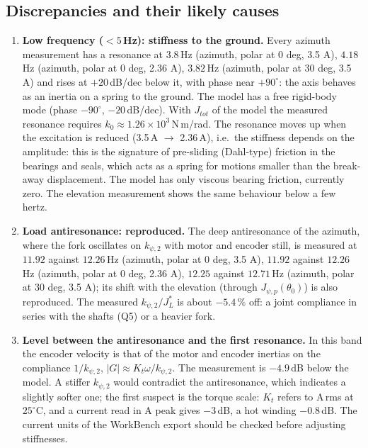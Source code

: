 \documentclass[10pt,a4paper]{article}
\numberwithin{equation}{section}
\begin{document}
\subsection{Discrepancies and their likely causes}\label{subsec:exp_discussion}
\begin{enumerate}
\item \textbf{Low frequency ($<5$\,Hz): stiffness to the ground.} Every azimuth measurement has a resonance at $3.8$\,Hz (azimuth, polar at 0 deg, 3.5 A), $4.18$\,Hz (azimuth, polar at 0 deg, 2.36 A), $3.82$\,Hz (azimuth, polar at 30 deg, 3.5 A) and rises at $+20$\,dB/dec below it, with phase near $+90^\circ$: the axis behaves as an inertia on a spring to the ground. The model has a free rigid-body mode (phase $-90^\circ$, $-20$\,dB/dec). With $J_{tot}$ of the model the measured resonance requires $k_0 \approx 1.26\times10^{3}$\,N\,m/rad. The resonance moves up when the excitation is reduced (3.5\,A $\to$ 2.36\,A), i.e.\ the stiffness depends on the amplitude: this is the signature of pre-sliding (Dahl-type) friction in the bearings and seals, which acts as a spring for motions smaller than the break-away displacement. The model has only viscous bearing friction, currently zero. The elevation measurement shows the same behaviour below a few hertz.
\item \textbf{Load antiresonance: reproduced.} The deep antiresonance of the azimuth, where the fork oscillates on $k_{\psi,2}$ with motor and encoder still, is measured at $11.92$ against $12.26$\,Hz (azimuth, polar at 0 deg, 3.5 A), $11.92$ against $12.26$\,Hz (azimuth, polar at 0 deg, 2.36 A), $12.25$ against $12.71$\,Hz (azimuth, polar at 30 deg, 3.5 A); its shift with the elevation (through $J_{\psi,p}(\theta_0)$) is also reproduced. The measured $k_{\psi,2}/J_L^*$ is about $-5.4\,\%$ off: a joint compliance in series with the shafts (Q5) or a heavier fork.
\item \textbf{Level between the antiresonance and the first resonance.} In this band the encoder velocity is that of the motor and encoder inertias on the compliance $1/k_{\psi,2}$, $|G|\approx K_t\omega/k_{\psi,2}$. The measurement is $-4.9$\,dB below the model. A stiffer $k_{\psi,2}$ would contradict the antiresonance, which indicates a slightly softer one; the first suspect is the torque scale: $K_t$ refers to A\,rms at $25^\circ$C, and a current read in A peak gives $-3$\,dB, a hot winding $-0.8$\,dB. The current units of the WorkBench export should be checked before adjusting stiffnesses.

\end{enumerate}
\end{document}
